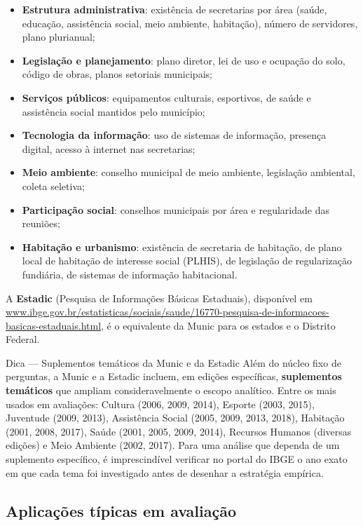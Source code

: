 \begin{itemize}
  \item \textbf{Estrutura administrativa}: existência de secretarias por área (saúde, educação, assistência social, meio ambiente, habitação), número de servidores, plano plurianual;
  \item \textbf{Legislação e planejamento}: plano diretor, lei de uso e ocupação do solo, código de obras, planos setoriais municipais;
  \item \textbf{Serviços públicos}: equipamentos culturais, esportivos, de saúde e assistência social mantidos pelo município;
  \item \textbf{Tecnologia da informação}: uso de sistemas de informação, presença digital, acesso à internet nas secretarias;
  \item \textbf{Meio ambiente}: conselho municipal de meio ambiente, legislação ambiental, coleta seletiva;
  \item \textbf{Participação social}: conselhos municipais por área e regularidade das reuniões;
  \item \textbf{Habitação e urbanismo}: existência de secretaria de habitação, de plano local de habitação de interesse social (PLHIS), de legislação de regularização fundiária, de sistemas de informação habitacional.
\end{itemize}

A \textbf{Estadic} (Pesquisa de Informações Básicas Estaduais), disponível em \url{www.ibge.gov.br/estatisticas/sociais/saude/16770-pesquisa-de-informacoes-basicas-estaduais.html}, é o equivalente da Munic para os estados e o Distrito Federal.

\begin{boxdica}{Dica --- Suplementos temáticos da Munic e da Estadic}
Além do núcleo fixo de perguntas, a Munic e a Estadic incluem, em edições específicas, \textbf{suplementos temáticos} que ampliam consideravelmente o escopo analítico. Entre os mais usados em avaliações: Cultura (2006, 2009, 2014), Esporte (2003, 2015), Juventude (2009, 2013), Assistência Social (2005, 2009, 2013, 2018), Habitação (2001, 2008, 2017), Saúde (2001, 2005, 2009, 2014), Recursos Humanos (diversas edições) e Meio Ambiente (2002, 2017). Para uma análise que dependa de um suplemento específico, é imprescindível verificar no portal do IBGE o ano exato em que cada tema foi investigado antes de desenhar a estratégia empírica.
\end{boxdica}

\subsection{Aplicações típicas em avaliação}

